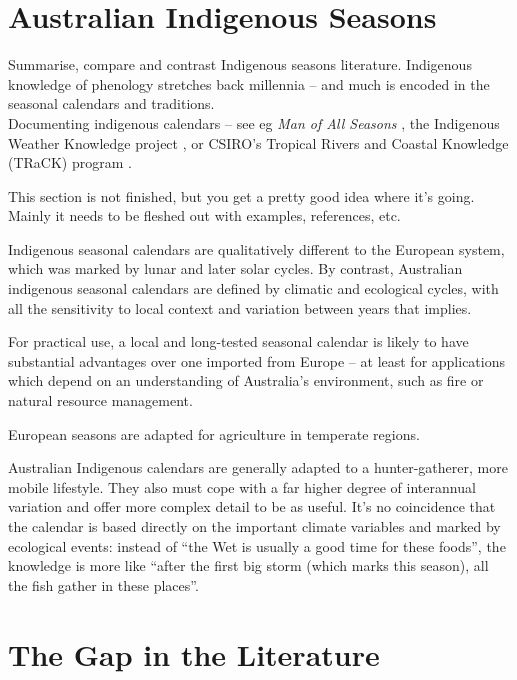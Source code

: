 \section{Australian Indigenous Seasons}

Summarise, compare and contrast Indigenous seasons literature.
Indigenous knowledge of phenology stretches back millennia – and much is 
encoded in the seasonal calendars and traditions.\\


Documenting indigenous calendars – see eg \textit{Man of All Seasons} \citep{davis1989},
the Indigenous Weather Knowledge project \citet{BOM-iwk},
or CSIRO’s Tropical Rivers and Coastal Knowledge (TRaCK) program \citep{CSIROcals,oconnor2010}.


This section is not finished, but you get a pretty good idea where it's 
going.  Mainly it needs to be fleshed out with examples, references, etc. 

Indigenous seasonal calendars are qualitatively different to the European 
system, which was marked by lunar and later solar cycles.  By contrast, 
Australian indigenous seasonal calendars are defined by climatic and ecological 
cycles, with all the sensitivity to local context and variation between years 
that implies.

For practical use, a local and long-tested seasonal calendar is likely to have 
substantial advantages over one imported from Europe – at least for 
applications which depend on an understanding of Australia's environment, such 
as fire or natural resource management.

European seasons are adapted for agriculture in temperate regions.

Australian Indigenous calendars are generally adapted to a hunter-gatherer, 
more mobile lifestyle.  They also must cope with a far higher degree of 
interannual variation and offer more complex detail to be as useful.  It's no 
coincidence that the calendar is based directly on the important climate 
variables and marked by ecological events:  instead of ``the Wet is usually a 
good time for these foods'', the knowledge is more like ``after the first big 
storm (which marks this season), all the fish gather in these places''.




\section{The Gap in the Literature}

